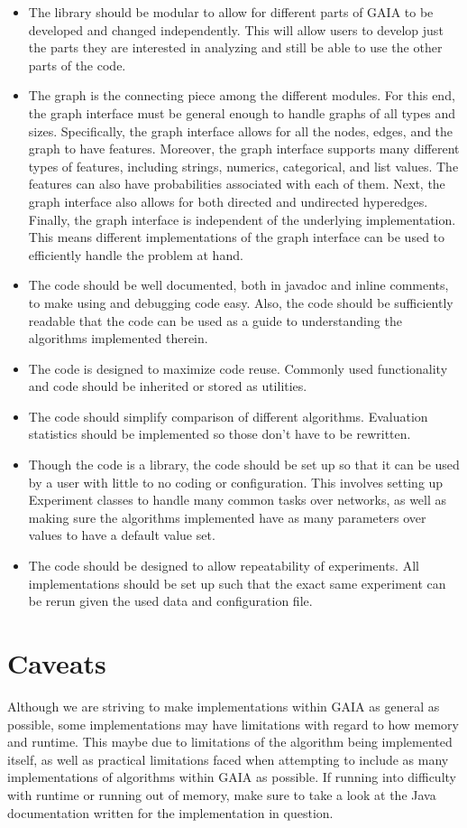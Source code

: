 \begin{itemize}
\item The library should be modular to allow for different parts of GAIA to be developed and
changed independently.  This will allow users to develop just the parts they are interested
in analyzing and still be able to use the other parts of the code.
\item The graph is the connecting piece among the different modules.  For this end,
the graph interface must be general enough to handle graphs of all types and sizes.
Specifically, the graph interface allows for all the nodes, edges, and the graph to
have features.  Moreover, the graph interface supports many different types of features,
including strings, numerics, categorical, and list values.  The features can also
have probabilities associated with each of them.  Next, the graph interface also allows
for both directed and undirected hyperedges.  Finally, the graph interface is independent
of the underlying implementation.  This means different implementations of the graph
interface can be used to efficiently handle the problem at hand.
\item The code should be well documented, both in javadoc and inline comments,
to make using and debugging code easy.  Also, the code should be sufficiently readable
that the code can be used as a guide to understanding the algorithms implemented therein.
\item The code is designed to maximize code reuse.  Commonly used functionality and code should
be inherited or stored as utilities.
\item The code should simplify comparison of different algorithms.  Evaluation statistics
should be implemented so those don't have to be rewritten.
\item Though the code is a library, the code should be set up so that it can be used by a user
with little to no coding or configuration.  This involves setting up Experiment classes
to handle many common tasks over networks, as well as making sure the algorithms
implemented have as many parameters over values to have a default value set.
\item The code should be designed to allow repeatability of experiments.   All implementations
should be set up such that the exact same experiment can be rerun given the used data and
configuration file.
\end{itemize}

\section{Caveats}
Although we are striving to make implementations within GAIA as general
as possible, some implementations may have limitations with regard
to how memory and runtime.  This maybe due to limitations of the
algorithm being implemented itself, as well as practical limitations faced
when attempting to include as many implementations of algorithms
within GAIA as possible.  If running into difficulty with runtime
or running out of memory, make sure to take a look at the Java documentation
written for the implementation in question.
